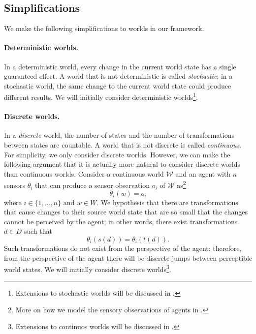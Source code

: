 \subsection{Simplifications}

We make the following simplifications to worlds in our framework.

\paragraph{Deterministic worlds.}
In a deterministic world, every change in the current world state has a single guaranteed effect.
A world that is not deterministic is called \emph{stochastic}; in a stochastic world, the same change to the current world state could produce different results.
We will initially consider deterministic worlds\footnote{Extensions to stochastic worlds will be discussed in .
}.

\paragraph{Discrete worlds.}
In a \emph{discrete} world, the number of states and the number of transformations between states are countable.
A world that is not discrete is called \emph{continuous}.
For simplicity, we only consider discrete worlds.
However, we can make the following argument that it is actually more natural to consider discrete worlds than continuous worlds.
Consider a continuous world $\mathscr{W}$ and an agent with $n$ sensors $\theta_{i}$ that can produce a sensor observation $o_{i}$ of $\mathscr{W}$ as\footnote{
More on how we model the sensory observations of agents in .
}
\begin{equation}
	\theta_{i}(w) = o_{i}
\end{equation}
where $i \in \{1, ..., n\}$ and $w \in W$.
We hypothesis that there are transformations that cause changes to their source world state that are so small that the changes cannot be perceived by the agent; in other words, there exist transformations $d \in D$ such that
\begin{equation}
	\theta_{i}(s(d)) = \theta_{i}(t(d)).
\end{equation}
Such transformations do not exist from the perspective of the agent; therefore, from the perspective of the agent there will be discrete jumps between perceptible world states.
We will initially consider discrete worlds\footnote{Extensions to continuos worlds will be discussed in .
}.


